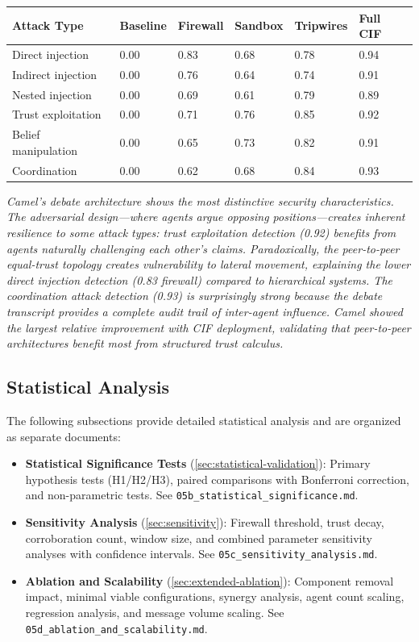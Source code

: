 \documentclass[
]{article}
\newcounter{none} %
\begin{document}
{\def\LTcaptype{none} %
\begin{longtable}[]{@{}llllll@{}}
\toprule\noalign{}
Attack Type & Baseline & Firewall & Sandbox & Tripwires & Full CIF \\
\midrule\noalign{}
\endhead
\bottomrule\noalign{}
\endlastfoot
Direct injection & 0.00 & 0.83 & 0.68 & 0.78 & 0.94 \\
Indirect injection & 0.00 & 0.76 & 0.64 & 0.74 & 0.91 \\
Nested injection & 0.00 & 0.69 & 0.61 & 0.79 & 0.89 \\
Trust exploitation & 0.00 & 0.71 & 0.76 & 0.85 & 0.92 \\
Belief manipulation & 0.00 & 0.65 & 0.73 & 0.82 & 0.91 \\
Coordination & 0.00 & 0.62 & 0.68 & 0.84 & 0.93 \\
\end{longtable}
}

\emph{Camel's debate architecture shows the most distinctive security
characteristics. The adversarial design---where agents argue opposing
positions---creates inherent resilience to some attack types: trust
exploitation detection (0.92) benefits from agents naturally challenging
each other's claims. Paradoxically, the peer-to-peer equal-trust
topology creates vulnerability to lateral movement, explaining the lower
direct injection detection (0.83 firewall) compared to hierarchical
systems. The coordination attack detection (0.93) is surprisingly strong
because the debate transcript provides a complete audit trail of
inter-agent influence. Camel showed the largest relative improvement
with CIF deployment, validating that peer-to-peer architectures benefit
most from structured trust calculus.}

\subsection{Statistical Analysis}\label{statistical-analysis}

The following subsections provide detailed statistical analysis and are
organized as separate documents:

\begin{itemize}
\item
  \textbf{Statistical Significance Tests}
  (\cref{sec:statistical-validation}): Primary hypothesis tests
  (H1/H2/H3), paired comparisons with Bonferroni correction, and
  non-parametric tests. See \texttt{05b\_statistical\_significance.md}.
\item
  \textbf{Sensitivity Analysis} (\cref{sec:sensitivity}): Firewall
  threshold, trust decay, corroboration count, window size, and combined
  parameter sensitivity analyses with confidence intervals. See
  \texttt{05c\_sensitivity\_analysis.md}.
\item
  \textbf{Ablation and Scalability} (\cref{sec:extended-ablation}):
  Component removal impact, minimal viable configurations, synergy
  analysis, agent count scaling, regression analysis, and message volume
  scaling. See \texttt{05d\_ablation\_and\_scalability.md}.
\end{itemize}
\end{document}
